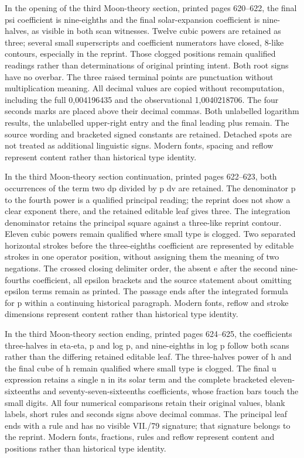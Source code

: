 In the opening of the third Moon-theory section, printed pages 620--622, the final psi coefficient is nine-eighths and the final solar-expansion coefficient is nine-halves, as visible in both scan witnesses. Twelve cubic powers are retained as three; several small superscripts and coefficient numerators have closed, 8-like contours, especially in the reprint. Those clogged positions remain qualified readings rather than determinations of original printing intent. Both root signs have no overbar. The three raised terminal points are punctuation without multiplication meaning. All decimal values are copied without recomputation, including the full 0,004196435 and the observational 1,0040218706. The four seconds marks are placed above their decimal commas. Both unlabelled logarithm results, the unlabelled upper-right entry and the final leading plus remain. The source wording and bracketed signed constants are retained. Detached spots are not treated as additional linguistic signs. Modern fonts, spacing and reflow represent content rather than historical type identity.

In the third Moon-theory section continuation, printed pages 622--623, both occurrences of the term two dp divided by p dv are retained. The denominator p to the fourth power is a qualified principal reading; the reprint does not show a clear exponent there, and the retained editable leaf gives three. The integration denominator retains the principal square against a three-like reprint contour. Eleven cubic powers remain qualified where small type is clogged. Two separated horizontal strokes before the three-eighths coefficient are represented by editable strokes in one operator position, without assigning them the meaning of two negations. The crossed closing delimiter order, the absent e after the second nine-fourths coefficient, all epsilon brackets and the source statement about omitting epsilon terms remain as printed. The passage ends after the integrated formula for p within a continuing historical paragraph. Modern fonts, reflow and stroke dimensions represent content rather than historical type identity.

In the third Moon-theory section ending, printed pages 624--625, the coefficients three-halves in eta-eta, p and log p, and nine-eighths in log p follow both scans rather than the differing retained editable leaf. The three-halves power of h and the final cube of h remain qualified where small type is clogged. The final u expression retains a single n in its solar term and the complete bracketed eleven-sixteenths and seventy-seven-sixteenths coefficients, whose fraction bars touch the small digits. All four numerical comparisons retain their original values, blank labels, short rules and seconds signs above decimal commas. The principal leaf ends with a rule and has no visible VII./79 signature; that signature belongs to the reprint. Modern fonts, fractions, rules and reflow represent content and positions rather than historical type identity.

